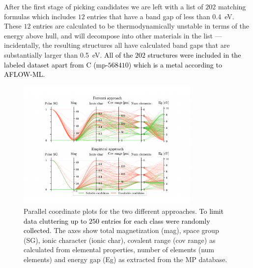 \documentclass[superscriptaddress,unsortedaddress,
 amsmath,amssymb,
 aps,
]{revtex4-2}
\newcommand{\mrk}[1]{\textcolor{black}{#1}}
\begin{document}
After the first stage of picking candidates we are left with a list of $202$ matching formulas which includes $12$ entries that have a band gap of less than \SI{0.4}{\electronvolt}.
These $12$ entries are calculated to be thermodynamically unstable in terms of the energy above hull, and will decompose into other materials in the list --- incidentally, the resulting structures all have calculated band gaps that are substantially larger than \SI{0.5}{\electronvolt}.
\mrk{All of the $202$ structures were included in the labeled dataset apart from C (mp-$568410$) which is a metal according to AFLOW-ML. }
 
\begin{figure}[t] %
    \centering
    \includegraphics[width=0.8\textwidth]{figure3.pdf}
    \caption{Parallel coordinate plots for the two different approaches. \mrk{To limit data cluttering up to $250$ entries for each class were randomly collected.}  
    The axes show total magnetization (mag), space group (SG), ionic character (ionic char), covalent range (cov range) as calculated from elemental properties, number of elements (num elements) and energy gap (Eg) as extracted from the MP database.} 
    \label{fig:parallel-coordinates-approaches}
\end{figure}
\end{document}
